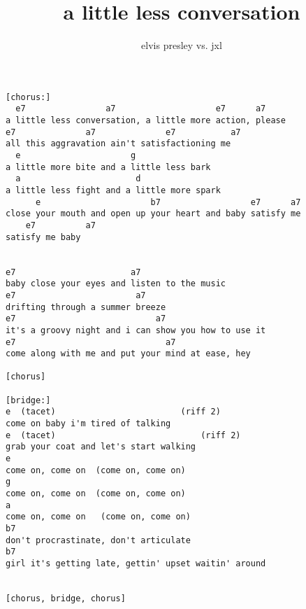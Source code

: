\author{elvis presley vs. jxl}
\title{a little less conversation}
\maketitle
\begin{verbatim}
[chorus:]
  e7                a7                    e7      a7
a little less conversation, a little more action, please
e7              a7              e7           a7
all this aggravation ain't satisfactioning me
  e                      g
a little more bite and a little less bark
  a                       d
a little less fight and a little more spark
	  e                      b7                  e7      a7
close your mouth and open up your heart and baby satisfy me
    e7          a7
satisfy me baby


e7                       a7
baby close your eyes and listen to the music
e7                        a7
drifting through a summer breeze
e7                            a7
it's a groovy night and i can show you how to use it
e7                              a7
come along with me and put your mind at ease, hey

[chorus]

[bridge:]
e  (tacet)                         (riff 2)
come on baby i'm tired of talking
e  (tacet)                             (riff 2)
grab your coat and let's start walking
e
come on, come on  (come on, come on)
g
come on, come on  (come on, come on)
a
come on, come on   (come on, come on)
b7
don't procrastinate, don't articulate
b7
girl it's getting late, gettin' upset waitin' around


[chorus, bridge, chorus]
\end{verbatim}